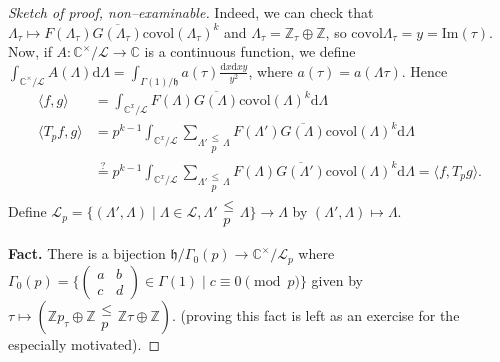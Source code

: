 \documentclass{article}
\theoremstyle{definition}
\begin{document}
\begin{proof}[Sketch of proof, non--examinable]
    Indeed, we can check that $\Lambda_\tau \mapsto F(\Lambda_\tau)\overline{G(\Lambda_\tau)}\text{covol}(\Lambda_\tau)^k$ and $\Lambda_{\tau} = \mathbb{Z}_\tau \oplus \mathbb{Z}$, so $\text{covol}\Lambda_\tau = y = \text{Im}(\tau)$. Now, if $A : \mathbb{C}^\times/\mathcal{L} \to \mathbb{C}$ is a continuous function, we define $\int_{\mathbb{C}^\times/\mathcal{L}}^{} A(\Lambda)\mathrm{d}\Lambda = \int_{\Gamma(1)/ \mathfrak{h}}^{} a(\tau)\frac{\mathrm{d}x\mathrm{d}xy}{y^2}$, where $a(\tau)=a(\Lambda \tau)$. Hence 
    \begin{align*}
        \langle f,g \rangle &= \int_{\mathbb{C}^x / \mathcal{L}}^{} F(\Lambda)\overline{G(\Lambda)}\text{covol}(\Lambda)^k \mathrm{d}\Lambda \\
        \langle T_p f, g \rangle &= p^{k-1} \int_{\mathbb{C}^x / \mathcal{L}}^{} \sum_{\Lambda' \substack{\le \\ p} \Lambda}^{} F(\Lambda')\overline{G(\Lambda )}\text{covol}(\Lambda)^k\mathrm{d}\Lambda \\
        &\stackrel{?}{=} p^{k-1} \int_{\mathbb{C}^x / \mathcal{L}}^{} \sum_{\Lambda' \substack{\le \\ p} \Lambda}^{} F(\Lambda)\overline{G(\Lambda')}\text{covol}(\Lambda)^k\mathrm{d}\Lambda = \langle f, T_p g \rangle.
    \end{align*}
    Define $\mathcal{L}_p = \{(\Lambda',\Lambda) \mid  \Lambda \in \mathcal{L}, \Lambda' \substack{\le \\ p} \Lambda\} \to \Lambda$ by $(\Lambda',\Lambda) \mapsto \Lambda$.
    \vspace{1mm}
     
    \textbf{Fact.} There is a bijection $\mathfrak{h}/\Gamma_0(p) \to \mathbb{C}^\times/\mathcal{L}_p$ where $\Gamma_0(p) = \{\begin{pmatrix} a &b\\c&d \end{pmatrix} \in \Gamma(1)\mid c \equiv 0 \pmod{p}\}$ given by $\tau \mapsto (\mathbb{Z}p_\tau \oplus \mathbb{Z} \substack{\le  \\p} \mathbb{Z}\tau \oplus \mathbb{Z})$. (proving this fact is left as an exercise for the especially motivated).
    \vspace{1mm}
     

\end{proof}
\end{document}
